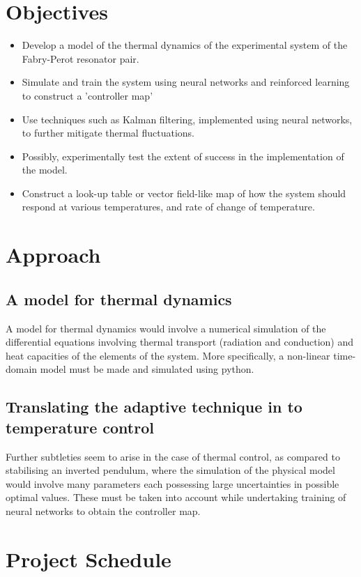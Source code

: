 \documentclass[colorlinks=true,pdfstartview=FitV,linkcolor=blue,
            citecolor=red,urlcolor=magenta]{ligodoc}
\begin{document}
\section{Objectives}
\begin{itemize}
\item Develop a model of the thermal dynamics of the experimental system of the Fabry-Perot resonator pair. 
\item Simulate and train the system using neural networks and reinforced learning to construct a 'controller map'
\item Use techniques such as Kalman filtering, implemented using neural networks, to further mitigate thermal fluctuations. 
\item Possibly, experimentally test the extent of success in the implementation of the model.
\item Construct a look-up table or vector field-like map of how the system should respond at various temperatures, and rate of change of temperature.
\end{itemize}

\section{Approach}

\subsection{A model for thermal dynamics}
A model for thermal dynamics would involve a numerical simulation of the differential equations involving thermal transport (radiation and conduction) and heat capacities of the elements of the system. More specifically, a non-linear time-domain model must be made and simulated using python.

\subsection{Translating the adaptive technique in \cite{broombalance} to temperature control}
Further subtleties seem to arise in the case of thermal control, as compared to stabilising an inverted pendulum, where the simulation of the physical model would involve many parameters each possessing large uncertainties in possible optimal values. These must be taken into account while undertaking training of neural networks to obtain the controller map.

\section{Project Schedule}
\end{document}
